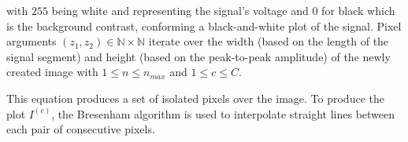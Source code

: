 \noindent with $255$ being white and representing the signal's voltage and $0$ for black which is the background contrast, conforming a black-and-white plot of the signal.  Pixel arguments $ (z_1,z_2) \in \mathbb{N} \times \mathbb{N}$ iterate over the width (based on the length of the signal segment) and height (based on the peak-to-peak amplitude) of the newly created image with $1 \leq n \leq n_{max}$ and $1 \leq c \leq C$.  

This equation produces a set of isolated pixels over the image.  To produce the plot $I^{(c)}$, the Bresenham \cite{Bresenham1965,Ramele2016} algorithm is used to interpolate straight lines between each pair of consecutive pixels.

